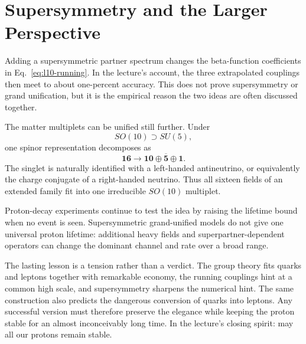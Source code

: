 \section{Supersymmetry and the Larger Perspective}

Adding a supersymmetric partner spectrum changes the beta-function coefficients in Eq.~\eqref{eq:l10-running}. In the lecture's account, the three extrapolated couplings then meet to about one-percent accuracy. This does not prove supersymmetry or grand unification, but it is the empirical reason the two ideas are often discussed together.

The matter multiplets can be unified still further. Under
\begin{equation}
SO(10)\supset SU(5),
\end{equation}
one spinor representation decomposes as
\begin{equation}
\mathbf{16}
\longrightarrow
\mathbf{10}\oplus\overline{\mathbf5}\oplus\mathbf1.
\label{eq:l10-so10}
\end{equation}
The singlet is naturally identified with a left-handed antineutrino, or equivalently the charge conjugate of a right-handed neutrino. Thus all sixteen fields of an extended family fit into one irreducible \(SO(10)\) multiplet.

Proton-decay experiments continue to test the idea by raising the lifetime bound when no event is seen. Supersymmetric grand-unified models do not give one universal proton lifetime: additional heavy fields and superpartner-dependent operators can change the dominant channel and rate over a broad range.


The lasting lesson is a tension rather than a verdict. The group theory fits quarks and leptons together with remarkable economy, the running couplings hint at a common high scale, and supersymmetry sharpens the numerical hint. The same construction also predicts the dangerous conversion of quarks into leptons. Any successful version must therefore preserve the elegance while keeping the proton stable for an almost inconceivably long time. In the lecture's closing spirit: may all our protons remain stable.
